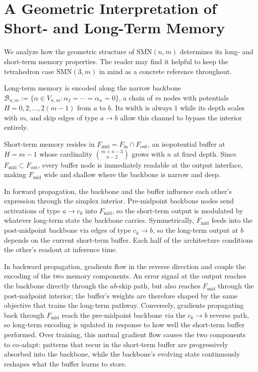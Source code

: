 \section{A Geometric Interpretation of Short- and Long-Term Memory}
\label{sec:interpretation}

We analyze how the geometric structure of $\mathrm{SMN}(n,m)$ determines its long- and short-term memory properties.  The reader may find it helpful to keep the tetrahedron case $\mathrm{SMN}(3,m)$ in mind as a concrete reference throughout.

Long-term memory is encoded along the narrow backbone $\mathcal{B}_{n,m} := \{\alpha \in V_{n,m} : \alpha_2 = \cdots = \alpha_n = 0\}$, a chain of $m$ nodes with potentials $H = 0, 2, \ldots, 2(m{-}1)$ from $a$ to $b$.  Its width is always $1$ while its depth scales with $m$, and skip edges of type $a \to b$ allow this channel to bypass the interior entirely.

Short-term memory resides in $F_{\mathrm{mid}} = F_{\mathrm{in}} \cap F_{\mathrm{out}}$, an isopotential buffer at $H = m-1$ whose cardinality $\binom{m+n-3}{n-2}$ grows with $n$ at fixed depth.  Since $F_{\mathrm{mid}} \subset F_{\mathrm{out}}$, every buffer node is immediately readable at the output interface, making $F_{\mathrm{mid}}$ wide and shallow where the backbone is narrow and deep.

In forward propagation, the backbone and the buffer influence each other's expression through the simplex interior.  Pre-midpoint backbone nodes send activations of type $a \to c_k$ into $F_{\mathrm{mid}}$, so the short-term output is modulated by whatever long-term state the backbone carries.  Symmetrically, $F_{\mathrm{mid}}$ feeds into the post-midpoint backbone via edges of type $c_k \to b$, so the long-term output at $b$ depends on the current short-term buffer.  Each half of the architecture conditions the other's readout at inference time.

In backward propagation, gradients flow in the reverse direction and couple the encoding of the two memory components.  An error signal at the output reaches the backbone directly through the $ab$-skip path, but also reaches $F_{\mathrm{mid}}$ through the post-midpoint interior; the buffer's weights are therefore shaped by the same objective that trains the long-term pathway.  Conversely, gradients propagating back through $F_{\mathrm{mid}}$ reach the pre-midpoint backbone via the $c_k \to b$ reverse path, so long-term encoding is updated in response to how well the short-term buffer performed.  Over training, this mutual gradient flow causes the two components to co-adapt: patterns that recur in the short-term buffer are progressively absorbed into the backbone, while the backbone's evolving state continuously reshapes what the buffer learns to store.
